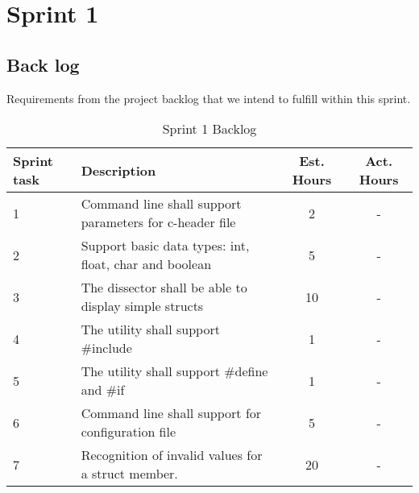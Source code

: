 \chapter{Sprint 1}

\section{Back log}
Requirements from the project backlog that we intend to fulfill within this sprint.

\begin{table}[ht] \center
\caption{Sprint 1 Backlog}
\begin{tabular}{p{1cm} p{6cm} c  c}
	Sprint task & Description & Est. Hours & Act. Hours \\
	\hline
	1 & Command line shall support parameters for c-header file & 2 & -\\
	2 & Support basic data types: int, float, char and boolean & 5 & -\\	
	3 & The dissector shall be able to display simple structs & 10 & -\\
	4 & The utility shall support \#include & 1 & -\\
	5 & The utility shall support \#define and \#if & 1 & -\\	
	6 & Command line shall support for configuration file & 5 & -\\
	7 & Recognition of invalid values for a struct member. & 20 & -\\
\end{tabular}
\end{table}

